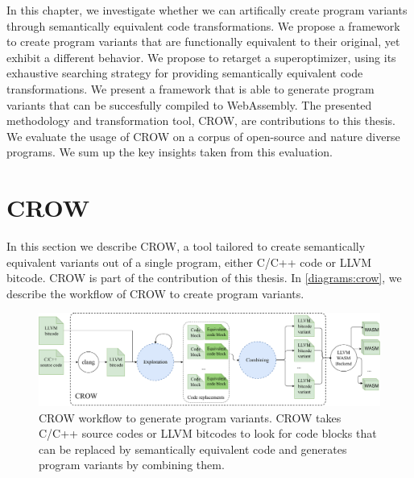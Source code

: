 

\label{chapter:generation}



In this chapter, we investigate whether we can artifically create program variants through semantically equivalent code transformations. We propose a framework to create program variants that are functionally equivalent to their original, yet exhibit a different behavior.
We propose to retarget a superoptimizer, using its exhaustive searching strategy for providing semantically equivalent code transformations. We present a framework that is able to generate program variants that can be succesfully compiled to WebAssembly.
The presented methodology and transformation tool, CROW, are contributions to this thesis.
We evaluate the usage of CROW on a corpus of open-source and nature diverse programs. 
We sum up the key insights taken from this evaluation.


\section{CROW}
\label{section:crow}
In this section we describe CROW, a tool tailored to create semantically equivalent variants out of a single program, either C/C++ code or LLVM bitcode. CROW is part of the contribution of this thesis.
In \autoref{diagrams:crow}, we describe the workflow of CROW to create program variants.

\begin{figure}[h]
    \includegraphics[width=\linewidth]{diagrams/generation/crow.drawio.pdf}
    \caption{CROW workflow to generate program variants. CROW takes C/C++ source codes or LLVM bitcodes to look for code blocks that can be replaced by semantically equivalent code and generates program variants by combining them.}
    \label{diagrams:crow}
\end{figure}

